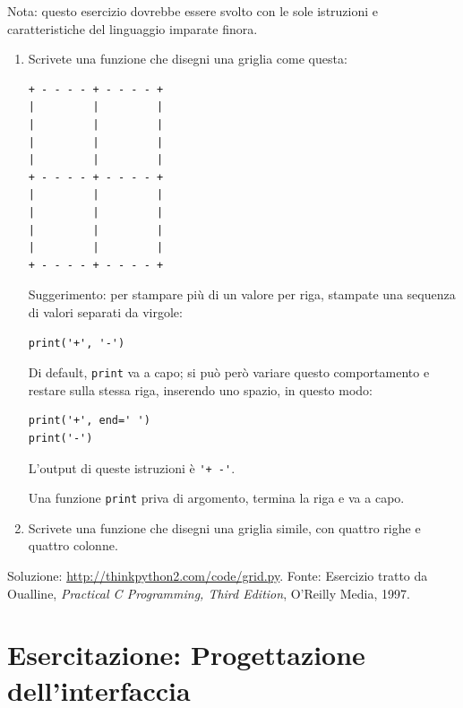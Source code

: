\documentclass[10pt]{book}
\begin{document}
\vspace{0.2in}
\begin{exercise}

Nota: questo esercizio dovrebbe essere svolto con le sole istruzioni e caratteristiche del linguaggio imparate finora.

\begin{enumerate}

\item Scrivete una funzione che disegni una griglia come questa:

\begin{verbatim}
+ - - - - + - - - - +
|         |         |
|         |         |
|         |         |
|         |         |
+ - - - - + - - - - +
|         |         |
|         |         |
|         |         |
|         |         |
+ - - - - + - - - - +
\end{verbatim}
%
Suggerimento: per stampare più di un valore per riga, stampate una sequenza di valori separati da virgole:

\begin{verbatim}
print('+', '-')
\end{verbatim}
%
Di default, {\tt print} va a capo; si può però variare questo comportamento e restare sulla stessa riga, inserendo uno spazio, in questo modo:

\begin{verbatim}
print('+', end=' ')
print('-')
\end{verbatim}
%
L'output di queste istruzioni è \verb"'+ -'".

Una funzione {\tt print} priva di argomento, termina la riga e va a capo.

\item Scrivete una funzione che disegni una griglia simile, con quattro righe e quattro colonne.

\end{enumerate}

Soluzione: \url{http://thinkpython2.com/code/grid.py}.
Fonte: Esercizio tratto da Oualline, {\em Practical C Programming, Third Edition}, O'Reilly Media, 1997.

\end{exercise}





\chapter{Esercitazione: Progettazione dell'interfaccia}
\label{turtlechap}
\end{document}
